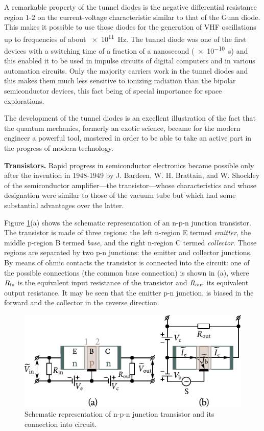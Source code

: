 A remarkable property of the tunnel diodes is the negative differential resistance region $1$-$2$ on the current-voltage characteristic similar to that of the Gunn diode. This makes it possible to use those diodes for the generation of VHF oscillations up to frequencies of about \SI{e11}{\hertz}. The tunnel diode was one of the first devices with a switching time of a fraction of a nanosecond (\SI{e-10}{\second}) and this enabled it to be used in impulse circuits of digital computers and in various automation circuits. Only the majority carriers work in the tunnel diodes and this makes them much less sensitive to ionizing radiation than the bipolar semiconductor devices, this fact being of special importance for space explorations.

The development of the tunnel diodes is an excellent illustration of the fact that the quantum mechanics, formerly an exotic science, became for the modern engineer a powerful tool, mastered in order to be able to take an active part in the progress of modern technology.

\textbf{Transistors.} Rapid progress in semiconductor electronics became possible only after the invention in 1948-1949 by J. Bardeen, W. H. Brattain, and W. Shockley of the semiconductor amplifier---the transistor---whose characteristics and whose designation were similar to those of the vacuum tube but which had some substantial advantages over the latter.

Figure \ref{fig:8_22}(a) shows the schematic representation of an n-p-n junction transistor. The transistor is made of three regions: the left n-region E termed \textit{emitter}, the middle p-region B termed \textit{base}, and the right n-region C termed \textit{collector}. Those regions are separated by two p-n junctions: the emitter and collector junctions. By means of ohmic contacts the transistor is connected into the circuit: one of the possible connections (the common base connection) is shown in (a), where $R_{\text{in}}$ is the equivalent input resistance of the transistor and $R_{\text{out}}$ its equivalent output resistance. It may be seen that the emitter p-n junction, is biased in the forward and the collector in the reverse direction.

\begin{figure}[t]
	\begin{center}
		\includegraphics[scale=1.2]{figures/ch_08/fig_8_22.pdf}
		\caption[]{Schematic representation of n-p-n junction transistor and its connection into circuit.}
		\label{fig:8_22}
	\end{center}
	\vspace{-0.8cm}
\end{figure}

